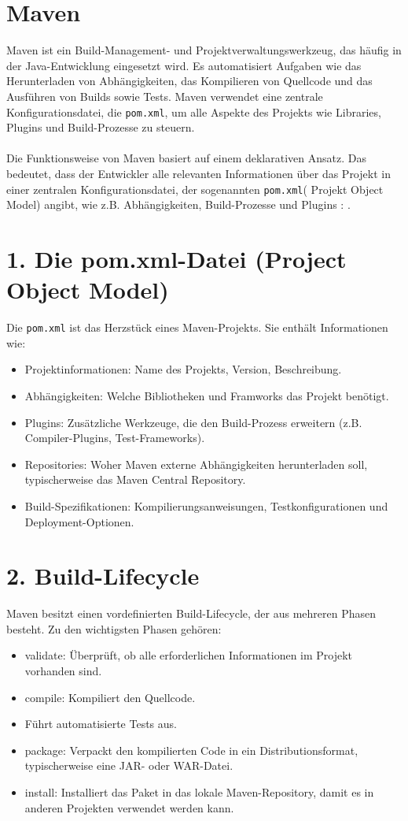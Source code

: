 \documentclass[a4paper,12pt]{scrreprt}
\begin{document}
	\section{Maven}
	Maven ist ein Build-Management- und Projektverwaltungswerkzeug, das häufig in der Java-Entwicklung eingesetzt wird. Es automatisiert Aufgaben wie das Herunterladen von Abhängigkeiten, das Kompilieren von Quellcode und das Ausführen von Builds sowie Tests. Maven verwendet eine zentrale Konfigurationsdatei, die \texttt{pom.xml}, um alle Aspekte des Projekts wie Libraries, Plugins und Build-Prozesse zu steuern.\\ \\
	Die Funktionsweise von Maven basiert auf einem deklarativen Ansatz. Das bedeutet, dass der Entwickler alle relevanten Informationen über das Projekt in einer zentralen Konfigurationsdatei, der sogenannten \texttt{pom.xml}( Projekt Object Model) angibt, wie z.B. Abhängigkeiten, Build-Prozesse und Plugins : \cite{deinhard24}.
	\section*{\small \textbf{1. Die pom.xml-Datei (Project Object Model)}}
	Die \texttt{pom.xml} ist das Herzstück eines Maven-Projekts. Sie enthält Informationen wie:
	\begin{itemize}
		\item Projektinformationen: Name des Projekts, Version, Beschreibung.
		\item Abhängigkeiten: Welche Bibliotheken und Framworks das Projekt benötigt.
		\item Plugins: Zusätzliche Werkzeuge, die den Build-Prozess erweitern (z.B. Compiler-Plugins, Test-Frameworks).
		\item Repositories: Woher Maven externe Abhängigkeiten herunterladen soll, typischerweise das Maven Central Repository.
		\item Build-Spezifikationen: Kompilierungsanweisungen, Testkonfigurationen und Deployment-Optionen.
	\end{itemize}
	\section*{\small \textbf{2. Build-Lifecycle}}
	Maven besitzt einen vordefinierten Build-Lifecycle, der aus mehreren Phasen besteht. Zu den wichtigsten Phasen gehören:
	\begin{itemize}
		\item validate: Überprüft, ob alle erforderlichen Informationen im Projekt vorhanden sind.
		\item compile: Kompiliert den Quellcode.
		\item Führt automatisierte Tests aus.
		\item package: Verpackt den kompilierten Code in ein Distributionsformat, typischerweise eine JAR- oder WAR-Datei.
		\item install: Installiert das Paket in das lokale Maven-Repository, damit es in anderen Projekten verwendet werden kann.
	\end{itemize}
	
\end{document}
